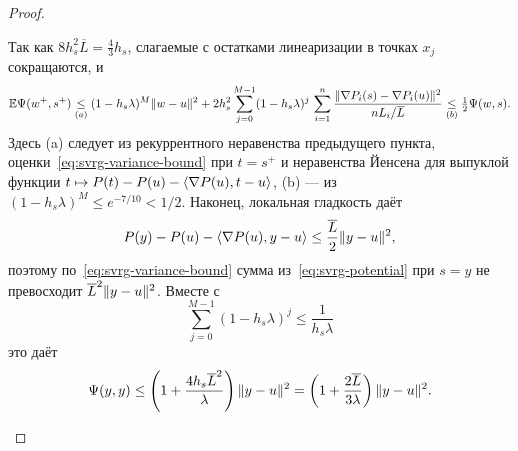 \begin{proof}
\begin{itemize}
Так как $8h_s^2\overline L=\frac43h_s$, слагаемые с остатками
линеаризации в точках $x_j$ сокращаются, и
\[
 \mathbb E\Psi(w^+,s^+) \mathrel{\underset{(a)}{\le}}
 (1-h_s\lambda)^M\lVert w-u\rVert^2
 +2h_s^2\sum_{j=0}^{M-1}(1-h_s\lambda)^j\,\sum_{i=1}^n\frac{\lVert\nabla P_i(s)-\nabla P_i(u)\rVert^2}{nL_i/\overline L} \mathrel{\underset{(b)}{\le}}\tfrac12\Psi(w,s).
\]
Здесь (a) следует из рекуррентного неравенства предыдущего пункта,
оценки~\eqref{eq:svrg-variance-bound} при $t=s^+$ и неравенства Йенсена
для выпуклой функции $t\mapsto P(t)-P(u)-\langle \nabla P(u),t-u\rangle$,
(b) --- из $(1-h_s\lambda)^M\le e^{-7/10}<1/2$.
Наконец, локальная гладкость даёт
\[
 P(y)-P(u)-\langle \nabla P(u),y-u\rangle\le\frac{\overline L}2\lVert y-u\rVert^2,
\]
поэтому по~\eqref{eq:svrg-variance-bound} сумма
из~\eqref{eq:svrg-potential} при $s=y$ не превосходит $\overline L^2\lVert y-u\rVert^2$.
Вместе с
\[
 \sum_{j=0}^{M-1}(1-h_s\lambda)^j\le\frac1{h_s\lambda}
\]
это даёт
\[
 \Psi(y,y)\le\left(1+\frac{4h_s\overline L^2}{\lambda}\right)\lVert y-u\rVert^2
 =\left(1+\frac{2\overline L}{3\lambda}\right)\lVert y-u\rVert^2.
\]
\end{itemize}
\end{proof}

